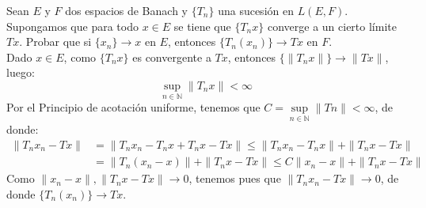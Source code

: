 \begin{ejercicio}
    Sean $E$ y $F$ dos espacios de Banach y $\{T_n\}$ una sucesión en $L(E,F)$. Supongamos que para todo $x\in E$ se tiene que $\{T_nx\}$ converge a un cierto límite $Tx$. Probar que si $\{x_n\}\to x$ en $E$, entonces $\{T_n(x_n)\}\to Tx$ en $F$.\\

    \noindent
    Dado $x\in E$, como $\{T_nx\}$ es convergente a $Tx$, entonces $\{\|T_nx\|\}\to \|Tx\|$, luego:
    \begin{equation*}
        \sup_{n\in \mathbb{N}}\|T_nx\| < \infty
    \end{equation*}
    Por el Principio de acotación uniforme, tenemos que $C=\sup\limits_{n\in \mathbb{N}}\|Tn\| < \infty$, de donde:
    \begin{align*}
        \|T_nx_n - Tx\| &= \|T_nx_n - T_nx + T_nx - Tx\| \leq \|T_nx_n - T_nx\| + \|T_nx - Tx\| \\
                        &= \|T_n(x_n - x)\| + \|T_nx-Tx\| \leq C\|x_n-x\| + \|T_nx-Tx\|
    \end{align*}
    Como $\|x_n-x\|, \|T_nx-Tx\|\to 0$, tenemos pues que $\|T_nx_n - Tx\| \to 0$, de donde $\{T_n(x_n)\}\to Tx$.
\end{ejercicio}

